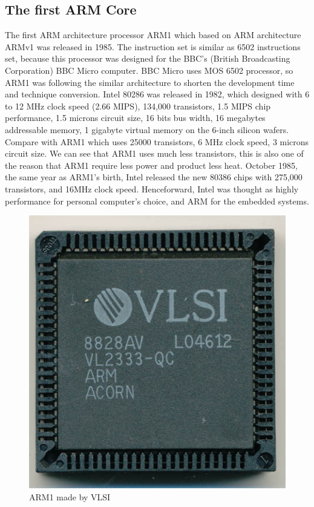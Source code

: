 \documentclass[conference]{IEEEtran}
\begin{document}
\subsection{The first ARM Core}
The first ARM architecture processor ARM1 which based on ARM architecture ARMv1 was released in 1985. The instruction set is similar as 6502 instructions set, because this processor was designed for the BBC's (British Broadcasting Corporation) BBC Micro computer. BBC Micro uses MOS 6502 processor, so ARM1 was following the similar architecture to shorten the development time and technique conversion. Intel 80286 was released in 1982, which designed with 6 to 12 MHz clock speed (2.66 MIPS), 134,000 transistors, 1.5 MIPS chip performance, 1.5 microns circuit size, 16 bits bus width, 16 megabytes addressable memory, 1 gigabyte virtual memory on the 6-inch silicon wafers.\cite{C} Compare with ARM1 which uses 25000 transistors, 6 MHz clock speed, 3 microns circuit size\cite{C}. We can see that ARM1 uses much less transistors, this is also one of the reason that ARM1 require less power and product less heat. October 1985, the same year as ARM1's birth, Intel released the new 80386 chips with 275,000 transistors, and 16MHz clock speed. Henceforward, Intel was thought as highly performance for personal computer's choice, and ARM for the embedded systems. 
\begin{figure}[h]
  \includegraphics[width=0.7\linewidth]{ARM1.jpg}
  \caption{ARM1 made by VLSI}
  \label{fig:AM}
\end{figure}
\end{document}
